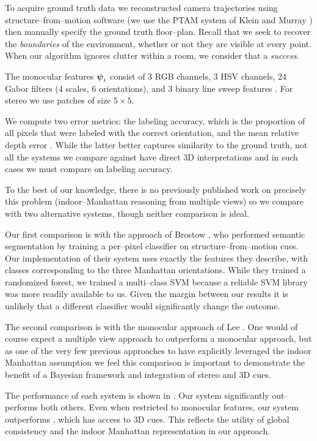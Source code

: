 To acquire ground truth data we reconstructed camera trajectories
using structure--from--motion software (we use the PTAM system of
Klein and Murray \cite{Klein07}) then manually specify the ground
truth floor--plan. Recall that we seek to recover the
\textit{boundaries} of the environment, whether or not they are
visible at every point. When our algorithm ignores clutter within a
room, we consider that a \textit{success}.

The monocular features $\boldsymbol{\psi}_i$ consist of 3 RGB channels, 3 HSV
channels, 24 Gabor filters (4 scales, 6 orientations), and 3 binary
line sweep features \cite{Lee09}. For stereo we use patches of size
$5 \times 5$.

We compute two error metrics: the labeling accuracy, which is the
proportion of all pixels that were labeled with the correct
orientation, and the mean relative depth error . While
the latter better captures similarity to the ground truth, not all the
systems we compare against have direct 3D interpretations and in such
cases we must compare on labeling accuracy.

To the best of our knowledge, there is no previously published work on
precisely this problem (indoor--Manhattan reasoning from multiple
views) so we compare with two alternative systems, though neither
comparison is ideal.

Our first comparison is with the approach of Brostow \etal
\cite{Brostow08}, who performed semantic segmentation by training a
per--pixel classifier on structure--from--motion cues. Our
implementation of their system uses exactly the features they
describe, with classes corresponding to the three Manhattan
orientations. While they trained a randomized forest, we trained a
multi--class SVM because a reliable SVM library was more readily
available to us. Given the margin between our results it is
unlikely that a different classifier would significantly change the
outcome.

The second comparison is with the monocular approach of
Lee \etal \cite{Lee09}. One would of course expect a multiple view
approach to outperform a monocular approach, but as one of the very
few previous approaches to have explicitly leveraged the indoor
Manhattan assumption we feel this comparison is important to
demonstrate the benefit of a Bayesian framework and integration of
stereo and 3D cues.

The performance of each system is shown in . Our
system significantly out--performs both others. Even when restricted
to monocular features, our system outperforms \cite{Brostow08}, which
has access to 3D cues. This reflects the utility of global consistency
and the indoor Manhattan representation in our approach.

